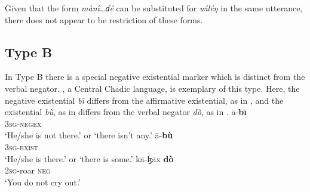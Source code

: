 \documentclass[output=paper]{langsci/langscibook}
\begin{document}
Given that the form \textit{m\`an\'\i…ɗ\'e} can be substituted for \textit{w{\'\i}l\'eŋ} in the same utterance, there does not appear to be restriction of these forms.

\subsection{Type B}\label{sec:3:3.3}

In Type B there is a special negative existential marker which is distinct
from the verbal negator. , a Central Chadic language, is
exemplary of this type. Here, the negative existential \textit{b\=\i}
differs from the affirmative existential, as in , and
the existential \textit{b\`u}, as in  differs from the verbal
negator \textit{d\`o}, as in .  
\ea\label{ex:muyang-none-some-cry}
\ea\label{ex:muyang-none} \gll \=a-\textbf{b\=\i}\\
3\textsc{sg}-\textsc{negex}\\ \glt `He/she is not there.' or `there isn't
any.' \ex\label{ex:muyang-some} \gll \=a-\textbf{b\`u}\\
3\textsc{sg}-\textsc{exist}\\ \glt `He/she is there.' or `there is some.'
\ex\label{ex:muyang-cry} \gll k\=a-ɮ\=ax \textbf{d\`o}\\ 2\textsc{sg}-roar
\textsc{neg}\\ \glt `You do not cry out.' \z\z
\end{document}
